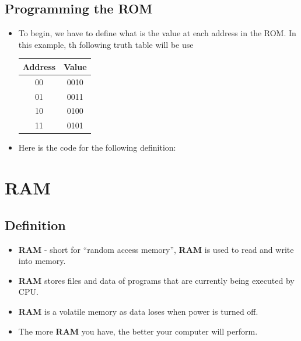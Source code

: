 \documentclass [12pt]{article}
\begin{document}
		\subsection{Programming the ROM}
		\begin {itemize}
			\item To begin, we have to define what is the value at each address in the ROM. In this example, th following truth table will be use \\
			\begin{table}[!h]
				\centering
				\begin{tabular}{|c|c|}
				\hline
				\textbf{Address} & \textbf{Value} \\ \hline
				00               & 0010           \\ \hline
				01               & 0011           \\ \hline
				10               & 0100           \\ \hline
				11               & 0101           \\ \hline
				\end{tabular}
			\end{table} 
			
			\item Here is the code for the following definition:\\
			
			
		\end {itemize}
		
		
		\section {RAM}
		
			\subsection{Definition}
			\begin {itemize}
				\item \textbf{RAM} - short for “random access memory”, \textbf{RAM} is used to read and write into memory. 
				
				\item \textbf{RAM} stores files and data of programs that are currently being executed by CPU.
				
				\item \textbf{RAM} is a volatile memory as data loses when power is turned off.
				
				\item The more \textbf{RAM} you have, the better your computer will perform.
			\end{itemize} 
			
\end{document}

